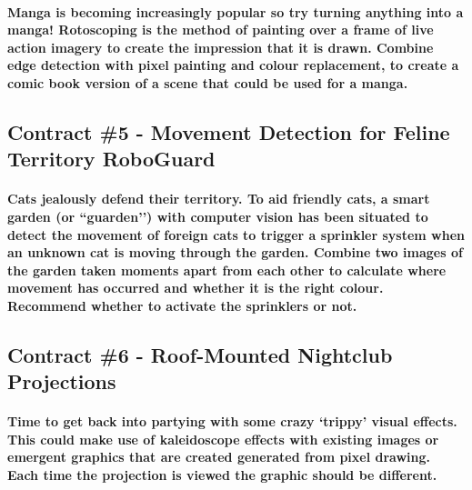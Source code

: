 \documentclass{../../fal_assignment}
\begin{document}
\paragraph{Manga is becoming increasingly popular so try turning anything into a manga! Rotoscoping is the method of painting over a frame of live action imagery to create the impression that it is drawn. Combine edge detection with pixel painting and colour replacement, to create a comic book version of a scene that could be used for a manga.}

\subsection*{Contract \#5 - Movement Detection for Feline Territory RoboGuard}

\paragraph{Cats jealously defend their territory. To aid friendly cats, a smart garden (or ``guarden’’) with computer vision has been situated to detect the movement of foreign cats to trigger a sprinkler system when an unknown cat is moving through the garden. Combine two images of the garden taken moments apart from each other to calculate where movement has occurred and whether it is the right colour. Recommend whether to activate the sprinklers or not.}

\subsection*{Contract \#6 - Roof-Mounted Nightclub Projections}

\paragraph{Time to get back into partying with some crazy `trippy' visual effects. This could make use of kaleidoscope effects with existing images or emergent graphics that are created generated from pixel drawing. Each time the projection is viewed the graphic should be different.}
\end{document}
